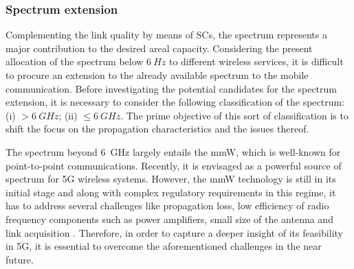 \subsubsection*{Spectrum extension}
Complementing the link quality by means of SCs, the spectrum %
represents a major contribution to the desired areal capacity. Considering the present allocation of the spectrum below $\SI{6}{Hz}$ to different wireless services, it is difficult to procure an extension to the already available spectrum to the mobile communication. Before investigating the potential candidates for the spectrum extension, it is necessary to consider the following classification of the spectrum:
(i) $> \SI{6}{GHz}$;
(ii) $\le \SI{6}{GHz}$.
The prime objective of this sort of classification is to shift the focus on the propagation characteristics and the issues thereof.


The spectrum beyond \SI{6}{GHz} largely entails the mmW, which is well-known for point-to-point communications. Recently, it is envisaged as a powerful source of spectrum for 5G wireless systems. However, the mmW technology is still in its initial stage and along with complex regulatory requirements in this regime, it has to address several challenges like propagation loss, low efficiency of radio frequency components such as power amplifiers, small size of the antenna and link acquisition \cite{Rapp13}. Therefore, in order to capture a deeper insight of its feasibility in 5G, it is essential to overcome the aforementioned challenges in the near future.

